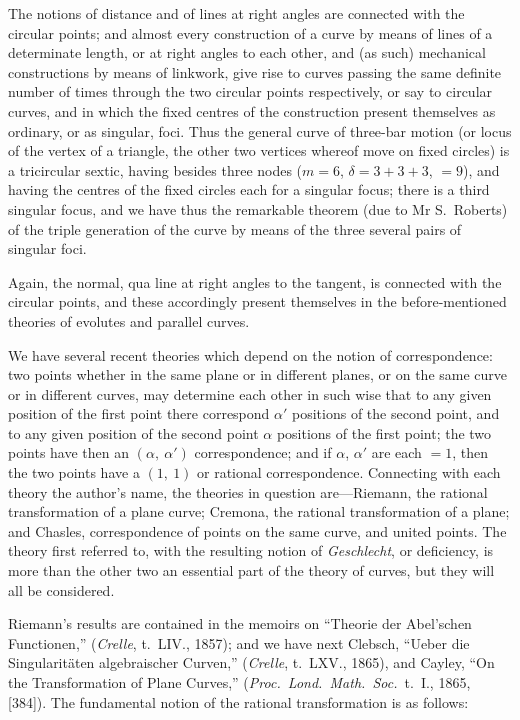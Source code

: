 \documentclass[12pt,a4paper,oneside]{book}
\begin{document}
The notions of distance and of lines at right angles are connected with the circular points; and almost every construction of a curve by means of lines of a determinate length, or at right angles to each other, and (as such) mechanical constructions by means of linkwork, give rise to curves passing the same definite number of times through the two circular points respectively, or say to circular curves, and in which the fixed centres of the construction present themselves as ordinary, or as singular, foci. Thus the general curve of three-bar motion (or locus of the vertex of a triangle, the other two vertices whereof move on fixed circles) is a tricircular sextic, having besides three nodes ($m=6$, $\delta=3+3+3$, $=9$), and having the centres of the fixed circles each for a singular focus; there is a third singular focus, and we have thus the remarkable theorem (due to Mr S.~Roberts) of the triple generation of the curve by means of the three several pairs of singular foci.

\newpage
Again, the normal, qua line at right angles to the tangent, is connected with the circular points, and these accordingly present themselves in the before-mentioned theories of evolutes and parallel curves.

We have several recent theories which depend on the notion of correspondence: two points whether in the same plane or in different planes, or on the same curve or in different curves, may determine each other in such wise that to any given position of the first point there correspond $\alpha'$ positions of the second point, and to any given position of the second point $\alpha$ positions of the first point; the two points have then an $(\alpha,\ \alpha')$ correspondence; and if $\alpha$, $\alpha'$ are each $=1$, then the two points have a $(1,\ 1)$ or rational correspondence. Connecting with each theory the author's name, the theories in question are---Riemann, the rational transformation of a plane curve; Cremona, the rational transformation of a plane; and Chasles, correspondence of points on the same curve, and united points. The theory first referred to, with the resulting notion of \textit{Geschlecht}, or deficiency, is more than the other two an essential part of the theory of curves, but they will all be considered.

Riemann's results are contained in the memoirs on ``Theorie der Abel'schen Functionen,'' (\textit{Crelle}, t.~LIV., 1857); and we have next Clebsch, ``Ueber die Singularit\"aten algebraischer Curven,'' (\textit{Crelle}, t.~LXV., 1865), and Cayley, ``On the Transformation of Plane Curves,'' (\textit{Proc.\ Lond.\ Math.\ Soc.}\ t.~I., 1865, [384]). The fundamental notion of the rational transformation is as follows:
\end{document}
